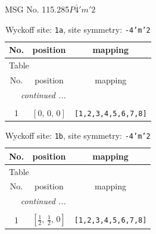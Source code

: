 \documentclass[fleqn,8pt]{jsarticle}
\begin{document}
\setcounter{MaxMatrixCols}{32}

\renewcommand{\tablename}{Table~}
\renewcommand{\figurename}{Figure~}
\begin{center}
\LARGE
MSG No. 115.285\quad$P\bar{4}'m'2$
\end{center}
\renewcommand{\arraystretch}{1.2}
\begin{longtable}{ccc}
\caption{Wyckoff site: {\tt 1a}, site symmetry: {\tt -4'm'2}}
 \\
 \hline \hline
No. & position & mapping \\ \hline \endfirsthead

\multicolumn{2}{l}{\tablename\ \thetable{}} \\
 \hline \hline
No. & position & mapping \\ \hline \endhead

 \hline \hline
\multicolumn{2}{r}{\footnotesize\it continued ...} \\ \endfoot

 \hline \hline
\multicolumn{2}{r}{} \\ \endlastfoot

1 & $\left[ 0,\, 0,\, 0 \right]$ & {\tt [1,2,3,4,5,6,7,8]} \\
\end{longtable}
\renewcommand{\arraystretch}{1.2}
\begin{longtable}{ccc}
\caption{Wyckoff site: {\tt 1b}, site symmetry: {\tt -4'm'2}}
 \\
 \hline \hline
No. & position & mapping \\ \hline \endfirsthead

\multicolumn{2}{l}{\tablename\ \thetable{}} \\
 \hline \hline
No. & position & mapping \\ \hline \endhead

 \hline \hline
\multicolumn{2}{r}{\footnotesize\it continued ...} \\ \endfoot

 \hline \hline
\multicolumn{2}{r}{} \\ \endlastfoot

1 & $\left[ \frac{1}{2},\, \frac{1}{2},\, 0 \right]$ & {\tt [1,2,3,4,5,6,7,8]} \\
\end{longtable}
\renewcommand{\arraystretch}{1.2}
\end{document}
